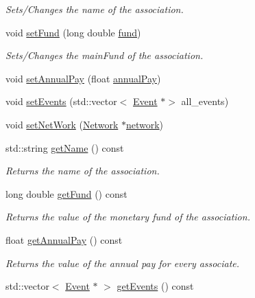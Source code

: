 \begin{DoxyCompactItemize}
\begin{DoxyCompactList}\small\item\em Sets/\+Changes the name of the association. \end{DoxyCompactList}\item 
void \mbox{\hyperlink{classAssociation_acbeba5c80457ba1c307c212bcad08b82}{set\+Fund}} (long double \mbox{\hyperlink{classAssociation_a891f18ca3dbbbdfa2e8fab54b1683133}{fund}})
\begin{DoxyCompactList}\small\item\em Sets/\+Changes the main\+Fund of the association. \end{DoxyCompactList}\item 
void \mbox{\hyperlink{classAssociation_a4279bd391a3110e4110d3f300b3423a3}{set\+Annual\+Pay}} (float \mbox{\hyperlink{classAssociation_a19f8a7aad1491bc14f558b0b852da0a4}{annual\+Pay}})
\item 
void \mbox{\hyperlink{classAssociation_a5611bc364e24e70f110332d1b2c63a08}{set\+Events}} (std\+::vector$<$ \mbox{\hyperlink{classEvent}{Event}} $\ast$$>$ all\+\_\+events)
\item 
void \mbox{\hyperlink{classAssociation_afa9bdcebf905cddc52870dd156a14d54}{set\+Net\+Work}} (\mbox{\hyperlink{classNetwork}{Network}} $\ast$\mbox{\hyperlink{classAssociation_a6747cedd4ce14a3b890c8ac87f676192}{network}})
\item 
std\+::string \mbox{\hyperlink{classAssociation_ab9b849706f996d80ed3439d43d06a958}{get\+Name}} () const
\begin{DoxyCompactList}\small\item\em Returns the name of the association. \end{DoxyCompactList}\item 
long double \mbox{\hyperlink{classAssociation_a4834d8fe0057ca4c55fa3e83bc47aae5}{get\+Fund}} () const
\begin{DoxyCompactList}\small\item\em Returns the value of the monetary fund of the association. \end{DoxyCompactList}\item 
float \mbox{\hyperlink{classAssociation_aa3bd82b207ae1ac0e44df1b481d4a8a1}{get\+Annual\+Pay}} () const
\begin{DoxyCompactList}\small\item\em Returns the value of the annual pay for every associate. \end{DoxyCompactList}\item 
std\+::vector$<$ \mbox{\hyperlink{classEvent}{Event}} $\ast$ $>$ \mbox{\hyperlink{classAssociation_a3deb177639e3c8042f7400f336fdda08}{get\+Events}} () const
$$
\end{DoxyCompactItemize}
